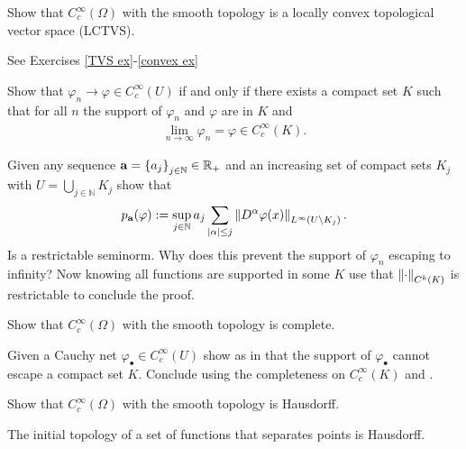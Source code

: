 \documentclass[
    a4paper,
    DIV=14,
    abstract=true,
    numbers=noenddot
]{scrartcl}
\begin{document}
\begin{exercise}
	Show that  $C_c^\infty(\Omega)$ with the smooth topology is a locally convex topological vector space (LCTVS).
\end{exercise}
\begin{hint}
	See Exercises \ref{TVS ex}-\ref{convex ex}
\end{hint}
\begin{exercise}\label{local convergence}
	Show that $\varphi_n \to \varphi \in C_c^\infty(U)$ if and only if
	there exists a compact set $K$ such that for all $n$ the support of $\varphi_n$ and $\varphi$ are in  $K$ and
	\begin{align*}
		\lim_{n \to \infty}\varphi_n  =\varphi \in  C_c^\infty(K).
	\end{align*}

\end{exercise}
\begin{hint}
	Given any sequence $\mathbf{a}=\left\{a_j\right\}_{j\in \mathbb{N}} \in \mathbb{R}_+$ and an increasing set of compact sets $K_j$ with $U=\bigcup_{j\in \mathbb{N}} K_j$ show that
	\begin{align*}
		p_{\mathbf{a}}(\varphi):=\sup _{j \in \mathbb{N}}{a_j} \sum_{|\alpha| \leq j}\left\lVert D^\alpha \varphi(x) \right\rVert_{L^\infty(U\setminus K_j)}.
	\end{align*}
	Is a restrictable seminorm. Why does this prevent the support of $\varphi_n$ escaping to infinity? Now knowing all functions are supported in some $K$ use that $\left\lVert \cdot  \right\rVert_{C^k(K)}$ is restrictable to conclude the proof.
\end{hint}
\begin{exercise}[Completeness]
	Show that $C_c^\infty(\Omega)$ with the smooth topology is complete.
\end{exercise}
\begin{hint}
	Given a Cauchy net $\varphi_{\bullet} \in C_c^\infty(U)$ show as in  that the support of  $\varphi_{\bullet}$ cannot escape a compact set $K$. Conclude using the completeness on  $C_c^\infty(K)$ and .
\end{hint}
\begin{exercise}
	Show that $C_c^\infty(\Omega)$ with the smooth topology is Hausdorff.
\end{exercise}
\begin{hint}
	The initial topology of a set of functions that separates points is Hausdorff.
\end{hint}
\end{document}
